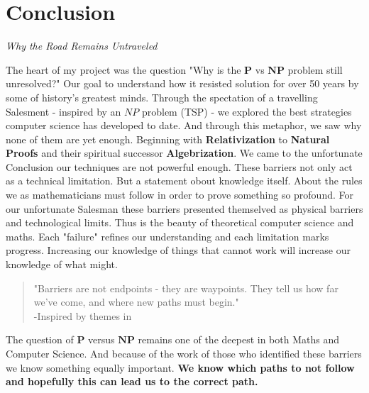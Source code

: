 \documentclass[12pt]{report}
\begin{document}
\section*{Conclusion}
\begin{center}
    {\Large\itshape Why the Road Remains Untraveled\par}
\end{center}
The heart of my project was the question "Why is the $\mathbf{P}$ vs $\mathbf{NP}$ problem still unresolved?"
Our goal to understand how it resisted solution for over 50 years by some of history's greatest minds.
Through the spectation of a travelling Salesment - inspired by an $NP$ problem (TSP) - we explored the best strategies computer science has developed to date.
And through this metaphor, we saw why none of them are yet enough.
Beginning with \textbf{Relativization} to \textbf{Natural Proofs} and their spiritual successor \textbf{Algebrization}.
We came to the unfortunate Conclusion our techniques are not powerful enough.
These barriers not only act as a technical limitation.
But a statement obout knowledge itself.
About the rules we as mathematicians must follow in order to prove something so profound.
For our unfortunate Salesman these barriers presented themselved as physical barriers and technological limits.
Thus is the beauty of theoretical computer science and maths.
Each "failure" refines our understanding and each limitation marks progress.
Increasing our knowledge of things that cannot work will increase our knowledge of what might.
\begin{quote}
    "Barriers are not endpoints - they are waypoints. They tell us how far we've come, and where new paths must begin."\\
    -Inspired by themes in \cite{arora2009}
\end{quote}
The question of $\mathbf{P}$ versus $\mathbf{NP}$ remains one of the deepest in both Maths and Computer Science.
And because of the work of those who identified these barriers we know something equally important.
\textbf{We know which paths to not follow and hopefully this can lead us to the correct path.}



\end{document}
